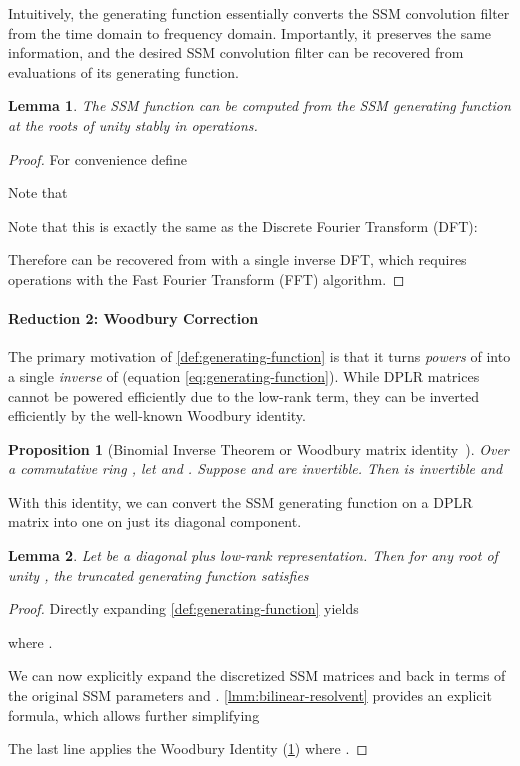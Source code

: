 \documentclass{article}
\newtheorem{lemma}{Lemma}[section]
\newtheorem{proposition}[theorem]{Proposition}
\begin{document}
Intuitively, the generating function essentially converts the SSM convolution filter from the time domain to frequency domain.
Importantly, it preserves the same information, and the desired SSM convolution filter can be recovered from evaluations of its generating function.
\begin{lemma}The SSM function  can be computed from the SSM generating function 
  at the roots of unity 
  stably in  operations.
\end{lemma}
\begin{proof}For convenience define
  
  Note that
  
  Note that this is exactly the same as the Discrete Fourier Transform (DFT):
  
  Therefore  can be recovered from  with a single inverse DFT,
  which requires  operations with the Fast Fourier Transform (FFT) algorithm.
\end{proof}


\paragraph{Reduction 2: Woodbury Correction}

The primary motivation of \cref{def:generating-function} is that it turns \emph{powers} of  into a single \emph{inverse} of  (equation \eqref{eq:generating-function}).
While DPLR matrices cannot be powered efficiently due to the low-rank term, they can be inverted efficiently by the well-known Woodbury identity.

\begin{proposition}[Binomial Inverse Theorem or Woodbury matrix identity~\cite{woodbury1950,golub2013matrix}]
  \label{prop:woodbury}
  Over a commutative ring , let  and . Suppose  and  are invertible. Then  is invertible and
  
\end{proposition}

With this identity, we can convert the SSM generating function on a DPLR matrix  into one on just its diagonal component.

\begin{lemma}\label{lmm:resolvent-woodbury}
  Let  be a diagonal plus low-rank representation.
  Then for any root of unity , the truncated generating function satisfies
  
\end{lemma}
\begin{proof}Directly expanding \cref{def:generating-function} yields
  
  where .

  We can now explicitly expand the discretized SSM matrices  and  back in terms of the original SSM parameters  and .
  \cref{lmm:bilinear-resolvent} provides an explicit formula, which allows further simplifying
  
  The last line applies the Woodbury Identity (\cref{prop:woodbury}) where .
\end{proof}
\end{document}

